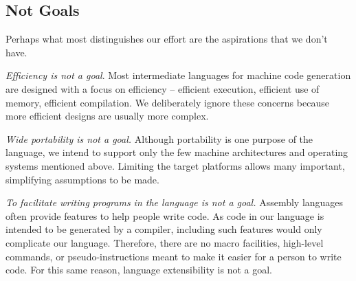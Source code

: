 \subsection{Not Goals}

Perhaps what most distinguishes our effort
are the aspirations that we don't have.

\emph{Efficiency is not a goal}.
Most intermediate languages for machine code generation
are designed with a focus on efficiency --
efficient execution, efficient use of memory, efficient compilation.
We deliberately ignore these concerns because more efficient designs
are usually more complex.

\emph{Wide portability is not a goal.}
Although portability is one purpose of the language, we intend
to support only the few machine architectures and operating systems
mentioned above. Limiting the target platforms allows many important,
simplifying assumptions to be made.

\emph{To facilitate writing programs in the language is not a goal.}
Assembly languages often provide features
to help people write code.
As code in our language is intended to be generated
by a compiler, including such features would only complicate our language.
Therefore, there are no macro facilities, high-level commands,
or pseudo-instructions meant to make it easier for a person to write code.
For this same reason, language extensibility is not a goal.
